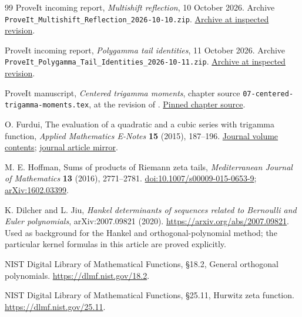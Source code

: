 \begin{thebibliography}{99}
ProveIt incoming report,
\emph{Multishift reflection}, 10 October 2026.
Archive \texttt{ProveIt\_Multishift\_Reflection\_2026-10-10.zip}.
\href{https://github.com/VladimirReshetnikov/ProveIt/blob/446dca9bd65c20e409d1d2561d4ffad408103e2a/docs/incoming/ProveIt_Multishift_Reflection_2026-10-10.zip}{Archive at inspected revision}.

ProveIt incoming report,
\emph{Polygamma tail identities}, 11 October 2026.
Archive \texttt{ProveIt\_Polygamma\_Tail\_Identities\_2026-10-11.zip}.
\href{https://github.com/VladimirReshetnikov/ProveIt/blob/446dca9bd65c20e409d1d2561d4ffad408103e2a/docs/incoming/ProveIt_Polygamma_Tail_Identities_2026-10-11.zip}{Archive at inspected revision}.

ProveIt manuscript,
\emph{Centered trigamma moments}, chapter source
\texttt{07-centered-trigamma-moments.tex}, at the revision of \cite{repo}.
\href{https://github.com/VladimirReshetnikov/ProveIt/blob/446dca9bd65c20e409d1d2561d4ffad408103e2a/Analysis/Polylogarithms/docs/manuscript/chapters/07-centered-trigamma-moments.tex}{Pinned chapter source}.

O. Furdui,
The evaluation of a quadratic and a cubic series with trigamma function,
\emph{Applied Mathematics E-Notes} \textbf{15} (2015), 187--196.
\href{https://www.math.nthu.edu.tw/~amen/2015/2015.htm}{Journal volume contents};
\href{https://www.kurims.kyoto-u.ac.jp/EMIS/journals/AMEN/2015/AMEN(150526).pdf}{journal article mirror}.

M. E. Hoffman,
Sums of products of Riemann zeta tails,
\emph{Mediterranean Journal of Mathematics} \textbf{13} (2016),
2771--2781.
\href{https://doi.org/10.1007/s00009-015-0653-9}{doi:10.1007/s00009-015-0653-9};
\href{https://arxiv.org/abs/1602.03399}{arXiv:1602.03399}.

K. Dilcher and L. Jiu,
\emph{Hankel determinants of sequences related to Bernoulli and Euler
polynomials}, arXiv:2007.09821 (2020).
\url{https://arxiv.org/abs/2007.09821}.
Used as background for the Hankel and orthogonal-polynomial method;
the particular kernel formulas in this article are proved explicitly.

NIST Digital Library of Mathematical Functions,
\S18.2, General orthogonal polynomials.
\url{https://dlmf.nist.gov/18.2}.

NIST Digital Library of Mathematical Functions,
\S25.11, Hurwitz zeta function.
\url{https://dlmf.nist.gov/25.11}.


\end{thebibliography}
